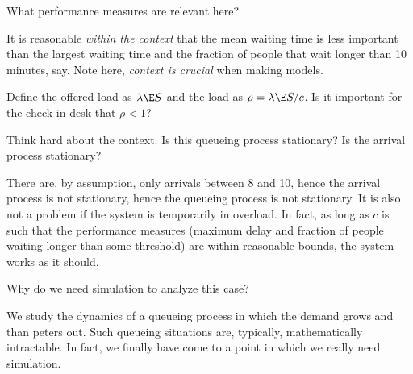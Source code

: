 \begin{exercise}
  What performance measures are relevant here?
\begin{solution}
    It is reasonable \emph{within the context} that the mean waiting time is less important than the largest waiting time and the fraction of people that wait longer than 10 minutes, say.
    Note here, \emph{context is crucial} when making models.
  \end{solution}
\end{exercise}

\begin{exercise}
  Define the offered load as $\lambda \E S$ and the load as $\rho = \lambda \E S/ c$. Is it important for the check-in desk that $\rho<1$?

\begin{hint}
    Think hard about the context. Is this queueing process stationary? Is the arrival process stationary?
\end{hint}
\begin{solution}
  There are, by assumption, only arrivals between 8 and 10, hence the arrival process is not stationary, hence the queueing process is not stationary.
  It is also not a problem if the system is temporarily in overload.
  In fact, as long as $c$ is such that the performance measures (maximum delay and fraction of people waiting longer than some threshold) are within reasonable bounds, the system works as it should.
  \end{solution}
\end{exercise}

\begin{exercise}
  Why do we need simulation to analyze this case?
\begin{solution}
    We study the dynamics of a queueing process in which the demand grows and than peters out. Such queueing situations are, typically, mathematically intractable. In fact, we finally have come to a point in which we really need simulation.
  \end{solution}
\end{exercise}


